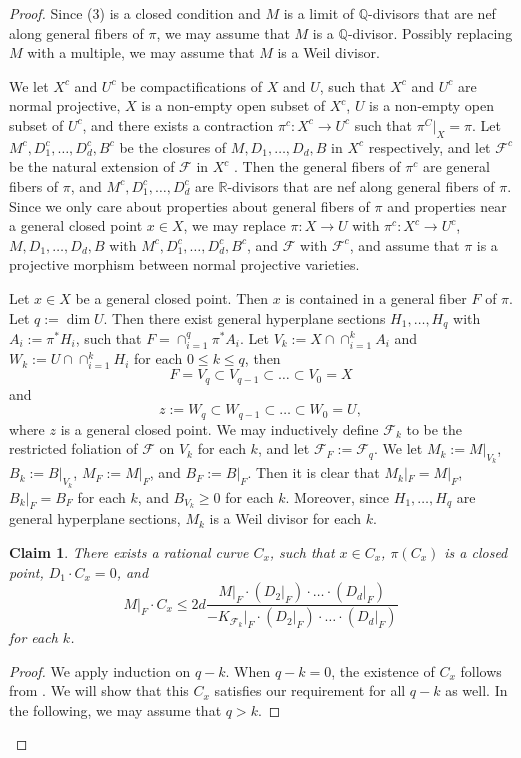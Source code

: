 \documentclass[11pt]{amsart}
\numberwithin{equation}{section}
\newcommand{\Qq}{\mathbb{Q}}
\newcommand{\Rr}{\mathbb{R}}
\newcommand{\Ff}{\mathcal{F}}
\newtheorem{claim}[thm]{Claim}
\theoremstyle{definition}
\theoremstyle{definition}
\theoremstyle{definition}
\begin{document}
\begin{proof}
Since  (3) is a closed condition and $M$ is a limit of $\Qq$-divisors that are nef along general fibers of $\pi$, we may assume that $M$ is a $\Qq$-divisor. Possibly replacing $M$ with a multiple, we may assume that $M$ is a Weil divisor.

We let $X^c$ and $U^c$ be compactifications of $X$ and $U$, such that $X^c$ and $U^c$ are normal projective, $X$ is a non-empty open subset of $X^c$, $U$ is a non-empty open subset of $U^c$, and there exists a contraction $\pi^c: X^c\rightarrow U^c$ such that $\pi^C|_{X}=\pi$. Let $M^c,D^c_1,\dots,D^c_d,B^c$ be the closures of $M,D_1,\dots,D_d,B$ in $X^c$ respectively, and let $\Ff^c$ be the natural extension of $\Ff$ in $X^c$ \cite[Lemma 2.2]{CS23b}. Then the general fibers of $\pi^c$ are general fibers of $\pi$, and $M^c,D^c_1,\dots,D^c_d$ are $\Rr$-divisors that are nef along general fibers of $\pi$. Since we only care about properties about general fibers of $\pi$ and properties near a general closed point $x\in X$, we may replace $\pi: X\rightarrow U$ with $\pi^c: X^c\rightarrow U^c$, $M,D_1,\dots,D_d,B$ with $M^c,D^c_1,\dots,D^c_d,B^c$, and $\Ff$ with $\Ff^c$, and assume that $\pi$ is a projective morphism between normal projective varieties.

Let $x\in X$ be a general closed point. Then $x$ is contained in a general fiber $F$ of $\pi$. Let $q:=\dim U$. Then there exist general hyperplane sections $H_1,\dots,H_q$ with $A_i:=\pi^*H_i$, such that $F=\cap_{i=1}^q\pi^*A_i$. Let $V_k:=X\cap\cap_{i=1}^kA_i$ and $W_k:=U\cap\cap_{i=1}^kH_i$ for each $0\leq k\leq q$, then
$$F=V_q\subset V_{q-1}\subset\dots\subset V_0=X$$
and
$$z:=W_q\subset W_{q-1}\subset\dots\subset W_0=U,$$
where $z$ is a general closed point. We may inductively define $\Ff_{k}$ to be the restricted foliation of $\Ff$ on $V_k$ for each $k$, and let $\Ff_F:=\Ff_{q}$. We let $M_k:=M|_{V_k}$, $B_k:=B|_{V_k}$, $M_F:=M|_F$, and $B_F:=B|_F$. Then it is clear that $M_k|_F=M|_F$, $B_k|_F=B_F$ for each $k$, and $B_{V_k}\geq 0$ for each $k$. Moreover, since $H_1,\dots,H_q$ are general hyperplane sections, $M_k$ is a Weil divisor for each $k$.

\begin{claim}\label{claim: induction bend and break}
There exists a rational curve $C_x$, such that $x\in C_x$, $\pi(C_x)$ is a closed point, $D_1\cdot C_x=0$, and
$$M|_F\cdot C_x\leq2d\frac{M|_F\cdot  (D_2|_F)\cdot\dots\cdot (D_d|_F)}{-K_{\Ff_k}|_F\cdot  (D_2|_F)\cdot\dots\cdot (D_d|_F)}$$
for each $k$.
\end{claim}
\begin{proof}
    We apply induction on $q-k$. When $q-k=0$, the existence of $C_x$ follows from \cite[Corollary 2.28]{Spi20}. We will show that this $C_x$ satisfies our requirement for all $q-k$ as well. In the following, we may assume that $q>k$.


\end{proof}
\end{proof}
\end{document}
